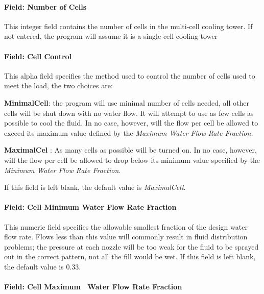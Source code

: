 \paragraph{Field: Number of Cells}\label{field-number-of-cells-3}

This integer field contains the number of cells in the multi-cell cooling tower. If not entered, the program will assume it is a single-cell cooling tower

\paragraph{Field: Cell Control}\label{field-cell-control-3}

This alpha field specifies the method used to control the number of cells used to meet the load, the two choices are:

\textbf{MinimalCell}: the program will use minimal number of cells needed, all other cells will be shut down with no water flow. It will attempt to use as few cells as possible to cool the fluid. In no case, however, will the flow per cell be allowed to exceed its maximum value defined by the \emph{Maximum Water Flow Rate Fraction.}

\textbf{MaximalCel} : As many cells as possible will be turned on. In no case, however, will the flow per cell be allowed to drop below its minimum value specified by the \emph{Minimum Water Flow Rate Fraction}.

If this field is left blank, the default value is \textit{MaximalCell}.

\paragraph{Field: Cell Minimum Water Flow Rate Fraction}\label{field-cell-minimum-water-flow-rate-fraction-3}

This numeric field specifies the allowable smallest fraction of the design water flow rate. Flows less than this value will commonly result in fluid distribution problems; the pressure at each nozzle will be too weak for the fluid to be sprayed out in the correct pattern, not all the fill would be wet. If this field is left blank, the default value is 0.33.

\paragraph{Field: Cell Maximum~ Water Flow Rate Fraction}\label{field-cell-maximum-water-flow-rate-fraction-3}

